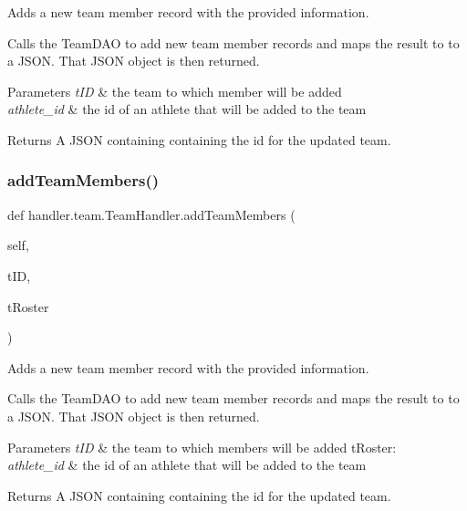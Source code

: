 Adds a new team member record with the provided information. 

Calls the Team\+D\+AO to add new team member records and maps the result to to a J\+S\+ON. That J\+S\+ON object is then returned.


\begin{DoxyParams}{Parameters}
{\em t\+ID} & the team to which member will be added \\
\hline
{\em athlete\+\_\+id} & the id of an athlete that will be added to the team \\
\hline
\end{DoxyParams}
\begin{DoxyReturn}{Returns}
A J\+S\+ON containing containing the id for the updated team. 
\end{DoxyReturn}
\mbox{\label{classhandler_1_1team_1_1_team_handler_ae689082bd35b83e30cac03ad19d79ba5}} 
\subsubsection{\texorpdfstring{add\+Team\+Members()}{addTeamMembers()}}
{\footnotesize\ttfamily def handler.\+team.\+Team\+Handler.\+add\+Team\+Members (\begin{DoxyParamCaption}\item[{}]{self,  }\item[{}]{t\+ID,  }\item[{}]{t\+Roster }\end{DoxyParamCaption})}



Adds a new team member record with the provided information. 

Calls the Team\+D\+AO to add new team member records and maps the result to to a J\+S\+ON. That J\+S\+ON object is then returned.


\begin{DoxyParams}{Parameters}
{\em t\+ID} & the team to which members will be added t\+Roster\+: \\
\hline
{\em athlete\+\_\+id} & the id of an athlete that will be added to the team \\
\hline
\end{DoxyParams}
\begin{DoxyReturn}{Returns}
A J\+S\+ON containing containing the id for the updated team. 
\end{DoxyReturn}
\mbox{\label{classhandler_1_1team_1_1_team_handler_a465fbb07ab9d8a5bcd3f53686da4e44b}} 
